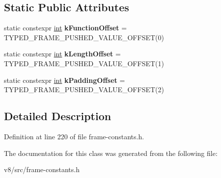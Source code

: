 \subsection*{Static Public Attributes}
\begin{DoxyCompactItemize}
\item 
\mbox{\label{classv8_1_1internal_1_1ArgumentsAdaptorFrameConstants_a9e0e2622cc386e8d576d418068aeb0b2}} 
static constexpr \mbox{\hyperlink{classint}{int}} {\bfseries k\+Function\+Offset} = T\+Y\+P\+E\+D\+\_\+\+F\+R\+A\+M\+E\+\_\+\+P\+U\+S\+H\+E\+D\+\_\+\+V\+A\+L\+U\+E\+\_\+\+O\+F\+F\+S\+ET(0)
\item 
\mbox{\label{classv8_1_1internal_1_1ArgumentsAdaptorFrameConstants_a5dade2fab5c8cd49bd46e6bed6f4fc96}} 
static constexpr \mbox{\hyperlink{classint}{int}} {\bfseries k\+Length\+Offset} = T\+Y\+P\+E\+D\+\_\+\+F\+R\+A\+M\+E\+\_\+\+P\+U\+S\+H\+E\+D\+\_\+\+V\+A\+L\+U\+E\+\_\+\+O\+F\+F\+S\+ET(1)
\item 
\mbox{\label{classv8_1_1internal_1_1ArgumentsAdaptorFrameConstants_a5ad7108bcb46bbd0d890a99e9183c633}} 
static constexpr \mbox{\hyperlink{classint}{int}} {\bfseries k\+Padding\+Offset} = T\+Y\+P\+E\+D\+\_\+\+F\+R\+A\+M\+E\+\_\+\+P\+U\+S\+H\+E\+D\+\_\+\+V\+A\+L\+U\+E\+\_\+\+O\+F\+F\+S\+ET(2)
\end{DoxyCompactItemize}


\subsection{Detailed Description}


Definition at line 220 of file frame-\/constants.\+h.



The documentation for this class was generated from the following file\+:\begin{DoxyCompactItemize}
\item 
v8/src/frame-\/constants.\+h\end{DoxyCompactItemize}
